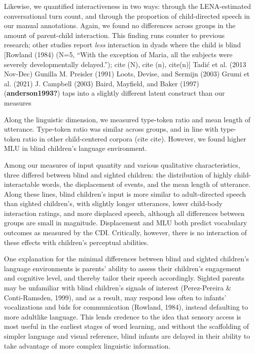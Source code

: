 \documentclass[
  man,floatsintext]{apa6}
\begin{document}
Likewise, we quantified interactiveness in two ways: through the LENA-estimated conversational turn count, and through the proportion of child-directed speech in our manual annotations. Again, we found no differences across groups in the amount of parent-child interaction. This finding runs counter to previous research; other studies report \emph{less} interaction in dyads where the child is blind {[}Rowland (1984) (N=5, ``With the exception of Maria, all the subjects were severely developmentally delayed.''); cite (N), cite (n), cite(n){]} Tadić et al. (2013 Nov-Dec) Gunilla M. Preisler (1991) Loots, Devise, and Sermijn (2003) Grumi et al. (2021) J. Campbell (2003) Baird, Mayfield, and Baker (1997) (\textbf{anderson1993?})
taps into a slightly different latent construct than our measures

Along the linguistic dimension, we measured type-token ratio and mean length of utterance. Type-token ratio was similar across groups, and in line with type-token ratio in other child-centered corpora (cite cite). However, we found higher MLU in blind children's language environment.

Among our measures of input quantity and various qualitative characteristics, three differed between blind and sighted children: the distribution of highly child-interactable words, the displacement of events, and the mean length of utterance. Along these lines, blind children's input is more similar to adult-directed speech than sighted children's, with slightly longer utterances, lower child-body interaction ratings, and more displaced speech, although all differences between groups are small in magnitude. Displacement and MLU both predict vocabulary outcomes as measured by the CDI. Critically, however, there is no interaction of these effects with children's perceptual abilities.

One explanation for the minimal differences between blind and sighted children's language environments is parents' ability to assess their children's engagement and cognitive level, and thereby tailor their speech accordingly. Sighted parents may be unfamiliar with blind children's signals of interest (Perez-Pereira \& Conti-Ramsden, 1999), and as a result, may respond less often to infants' vocalizations and bids for communication (Rowland, 1984), instead defaulting to more adultlike language. This lends credence to the idea that sensory access is most useful in the earliest stages of word learning, and without the scaffolding of simpler language and visual reference, blind infants are delayed in their ability to take advantage of more complex linguistic information.
\end{document}
